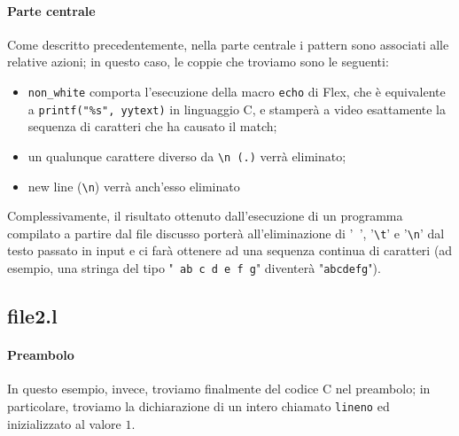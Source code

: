\documentclass[class=book, crop=false, oneside, 12pt]{standalone}
\begin{document}
\paragraph{Parte centrale}
Come descritto precedentemente, nella parte centrale i pattern sono associati alle relative azioni; in questo caso, le coppie che troviamo sono le seguenti:
\begin{itemize}
    \item \texttt{non\_white} comporta l'esecuzione della macro \texttt{echo} di Flex, che è equivalente a \texttt{printf("\%s", yytext)} in linguaggio C, e stamperà a video esattamente la sequenza di caratteri che ha causato il match;
    \item un qualunque carattere diverso da \texttt{\textbackslash n (.)} verrà eliminato;
    \item new line (\texttt{\textbackslash n}) verrà anch'esso eliminato
\end{itemize}

Complessivamente, il risultato ottenuto dall'esecuzione di un programma compilato a partire dal file discusso porterà all'eliminazione di '\texttt{ }', '\texttt{\textbackslash t}' e '\texttt{\textbackslash n}' dal testo passato in input e ci farà ottenere ad una sequenza continua di caratteri (ad esempio, una stringa del tipo "\texttt{ ab c d e \hspace{.8cm} f g}" diventerà "\texttt{abcdefg}").

\subsection*{file2.l}



\paragraph{Preambolo}
In questo esempio, invece, troviamo finalmente del codice C nel preambolo; in particolare, troviamo la dichiarazione di un intero chiamato \texttt{lineno} ed inizializzato al valore \(1\). 
\end{document}
